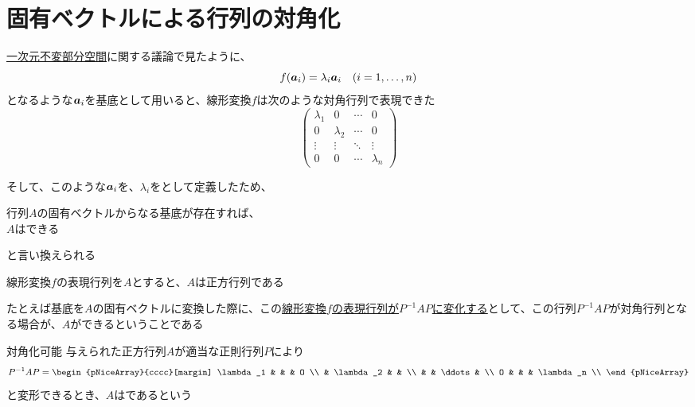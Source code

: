 \documentclass[../../../topic_linear-algebra]{subfiles}
\begin{document}
\sectionline
\section{固有ベクトルによる行列の対角化}

\hyperref[sec:1d-invariant-subspaces]{一次元不変部分空間}に関する議論で見たように、
\begin{equation*}
  f(\vb*{a}_i) = \lambda_i \vb*{a}_i \quad (i = 1, \dots, n)
\end{equation*}
となるような$\vb*{a}_i$を基底として用いると、線形変換$f$は次のような対角行列で表現できた
\begin{equation*}
  \begin{pmatrix}
    \lambda_1 & 0         & \cdots & 0         \\
    0         & \lambda_2 & \cdots & 0         \\
    \vdots    & \vdots    & \ddots & \vdots    \\
    0         & 0         & \cdots & \lambda_n
  \end{pmatrix}
\end{equation*}

そして、このような$\vb*{a}_i$を、$\lambda_i$をとして定義したため、
\begin{shaded}
  行列$A$の固有ベクトルからなる基底が存在すれば、\\
  $A$はできる
\end{shaded}
と言い換えられる

\sectionline

線形変換$f$の表現行列を$A$とすると、$A$は正方行列である

\br

たとえば基底を$A$の固有ベクトルに変換した際に、この\hyperref[thm:similarity-under-basis-change]{線形変換$f$の表現行列が$P^{-1}AP$に変化する}として、この行列$P^{-1}AP$が対角行列となる場合が、$A$ができるということである

\begin{definition}{対角化可能}
  与えられた正方行列$A$が適当な正則行列$P$により
  \begin{equation*}
    P^{-1}AP = \begin{pNiceArray}{cccc}[margin]
      \lambda_1 & & & O \\
      & \lambda_2 & & \\
      & & \ddots & \\
      O & & & \lambda_n \\
    \end{pNiceArray}
  \end{equation*}
  と変形できるとき、$A$はであるという
\end{definition}
\end{document}
